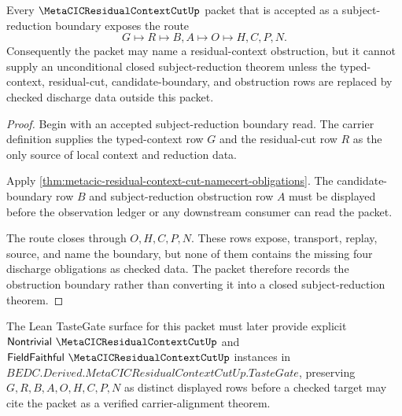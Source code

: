 \begin{theorem}
\label{thm:metacic-residual-context-cut-subject-reduction-obstruction}
Every $\MetaCICResidualContextCutUp$ packet that is accepted as a subject-reduction boundary exposes the route
$$
G\longmapsto R\longmapsto B,A\longmapsto O\longmapsto H,C,P,N .
$$
Consequently the packet may name a residual-context obstruction, but it cannot supply an unconditional closed subject-reduction theorem unless the typed-context, residual-cut, candidate-boundary, and obstruction rows are replaced by checked discharge data outside this packet.
\end{theorem}
\begin{proof}
Begin with an accepted subject-reduction boundary read. The carrier definition supplies the typed-context row $G$ and the residual-cut row $R$ as the only source of local context and reduction data.

Apply \autoref{thm:metacic-residual-context-cut-namecert-obligations}. The candidate-boundary row $B$ and subject-reduction obstruction row $A$ must be displayed before the observation ledger or any downstream consumer can read the packet.

The route closes through $O,H,C,P,N$. These rows expose, transport, replay, source, and name the boundary, but none of them contains the missing four discharge obligations as checked data. The packet therefore records the obstruction boundary rather than converting it into a closed subject-reduction theorem.
\end{proof}



The Lean TasteGate surface for this packet must later provide explicit $\mathsf{Nontrivial}\ \MetaCICResidualContextCutUp$ and $\mathsf{FieldFaithful}\ \MetaCICResidualContextCutUp$ instances in $BEDC.Derived.MetaCICResidualContextCutUp.TasteGate$, preserving $G,R,B,A,O,H,C,P,N$ as distinct displayed rows before a checked target may cite the packet as a verified carrier-alignment theorem.


